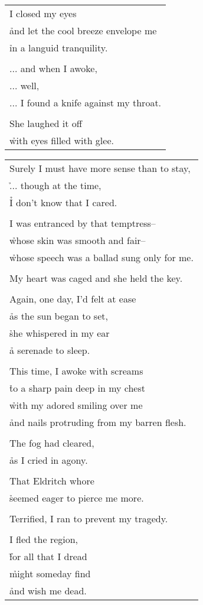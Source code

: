 \documentclass{article}
\begin{document}
\begin{center}
\begin{tabular}{l}
\\
I closed my eyes \\
\h and let the cool breeze envelope me \\
\h in a languid tranquility. \\
\\
... and when I awoke, \\
... well, \\
... I found a knife against my throat. \\
\\
She laughed it off \\
\h with eyes filled with glee. \\
\end{tabular}
\newpage
\begin{tabular}{l}
Surely I must have more sense than to stay, \\
\h ... though at the time, \\
\h I don't know that I cared. \\
\\
I was entranced by that temptress-- \\
\h whose skin was smooth and fair-- \\
\h whose speech was a ballad sung only for me. \\
\\
My heart was caged and she held the key. \\
\\
Again, one day, I'd felt at ease \\
\h as the sun began to set, \\
\h she whispered in my ear \\
\h a serenade to sleep. \\
\\
This time, I awoke with screams \\
\h to a sharp pain deep in my chest \\
\h with my adored smiling over me \\
\h and nails protruding from my barren flesh. \\
\\
The fog had cleared, \\
\h as I cried in agony. \\
\\
That Eldritch whore \\
\h seemed eager to pierce me more. \\
\\
Terrified, I ran to prevent my tragedy. \\
\\
I fled the region, \\
\h for all that I dread \\
\h might someday find \\
\h and wish me dead. \\
\end{tabular}
\end{center}
\end{document}
